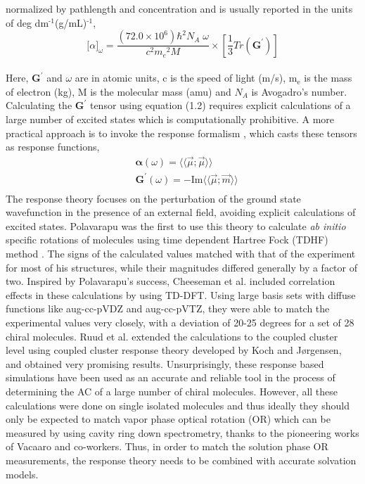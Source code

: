 normalized by pathlength and concentration and is usually reported in the units of deg dm$^{\text{-1}}$(g/mL)$^{\text{-1}}$,\cite{Crawford06}
\\
\begin{equation}
{\lbrack\alpha\rbrack}_{\omega} = \frac{(72.0 \times 10^6){\hbar}^2 N_A\;\omega}{c^2{m_e}^2 M} \times \left[ \frac{1}{3}Tr(\textbf{G}^\prime)\right]
\end{equation}
\\
Here, $\textbf{G}^\prime$ and $\omega$ are in atomic units, c is the speed of light (m/s), m$_{\text{e}}$ is the 
mass of electron (kg), M is the molecular mass (amu) and $N_A$ is Avogadro's number. Calculating the 
$\textbf{G}^\prime$ tensor using equation (1.2) requires explicit calculations of a large number of 
excited states which is computationally prohibitive. A more practical approach is to invoke the response formalism
\cite{Koch90,Kobayashi94}, which casts these tensors as response functions,
\begin{equation}
\begin{split}
&\bm{\alpha}(\omega) = \langle\langle\vec{\mu};\vec{\mu}\rangle\rangle\\
&\textbf{G}^{\prime}(\omega) = -\text{Im}\langle\langle\vec{\mu};\vec{m}\rangle\rangle\\
\end{split}
\end{equation} 
The response theory focuses on the perturbation of the ground state wavefunction in the presence of an external 
field, avoiding explicit calculations of excited states. Polavarapu was the first to use this theory to calculate 
{\em ab initio} specific rotations of molecules using time dependent Hartree Fock (TDHF) method \cite{Polavarapu96}. 
The signs of the calculated values matched with that of the experiment for most of his structures, while their magnitudes 
differed generally by a factor of two. Inspired by Polavarapu's success, Cheeseman et al. \cite{Cheeseman00,Stephens01} 
included correlation effects in these calculations by using TD-DFT. Using large basis sets with diffuse functions like 
aug-cc-pVDZ and aug-cc-pVTZ,\cite{Dunning89} they were able to match the experimental values very closely, with a 
deviation of 20-25 degrees for a set of 28 chiral molecules. Ruud et al. extended the calculations to the coupled cluster 
level using coupled cluster response theory developed by Koch and J{\o}rgensen\cite{Koch90}, and obtained very 
promising results\cite{Ruud03}. Unsurprisingly, these response based simulations have been used as an accurate and 
reliable tool in the process of determining the AC of a large number of chiral molecules\cite{Kondru99}. However, all 
these calculations were done on single isolated molecules and thus ideally they should only be expected to match vapor phase 
optical rotation (OR) which can be measured by using cavity ring down spectrometry, thanks to the pioneering 
works of Vacaaro and co-workers.\cite{} Thus, in order to match the solution phase OR measurements, the response theory
needs to be combined with accurate solvation models. \\ 

